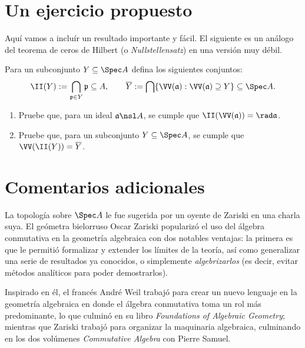 \documentclass[11pt, reqno]{amsart}
\begin{document}
\begin{enumerate}

\end{enumerate}

\appendix
\section{Un ejercicio propuesto}
Aquí vamos a incluír un resultado importante y fácil.
El siguiente es un análogo del teorema de ceros de Hilbert (o \emph{Nullstellensatz}) en una versión muy débil.

Para un subconjunto $Y \subseteq \Spec A$ defina los siguientes conjuntos:
\[
	\II(Y) := \bigcap_{\mathfrak{p} \in Y} \mathfrak{p} \subseteq A, \qquad
	\overline{Y} := \bigcap\{ \VV(\mathfrak{a}) : \VV(\mathfrak{a}) \supseteq Y \} \subseteq \Spec A.
\]
\begin{enumerate}
	\item Pruebe que, para un ideal $\mathfrak{a} \nsl A$, se cumple que $\II(\VV(\mathfrak{a})) = \rad\mathfrak{a}$.
	\item Pruebe que, para un subconjunto $Y \subseteq \Spec A$, se cumple que $\VV(\II(Y)) = \overline{Y}$.
\end{enumerate}

\section{Comentarios adicionales}
La topología sobre $\Spec A$ le fue sugerida por un oyente de Zariski en una charla suya.
El geómetra bielorruso Oscar Zariski popularizó el uso del álgebra conmutativa en la geometría algebraica con dos
notables ventajas: la primera es que le permitió formalizar y extender los límites de la teoría, así como generalizar
una serie de resultados ya conocidos, o simplemente \emph{algebrizarlos} (es decir, evitar métodos analíticos para poder
demostrarlos).

Inspirado en él, el francés André Weil trabajó para crear un nuevo lenguaje en la geometría algebraica en donde el
álgebra conmutativa toma un rol más predominante, lo que culminó en su libro \emph{Foundations of Algebraic Geometry};
mientras que Zariski trabajó para organizar la maquinaria algebraica, culminando en los dos volúmenes \emph{Commutative
Algebra} con Pierre Samuel.
\end{document}
